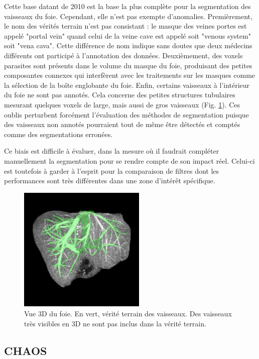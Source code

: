 Cette base datant de 2010 est la base la plus complète pour la segmentation des vaisseaux du foie. Cependant, elle n'est pas exempte d'anomalies. Premièrement, le nom des vérités terrain n'est pas consistant : le masque des veines portes est appelé "portal vein" quand celui de la veine cave est appelé soit "venous system" soit "vena cava". Cette différence de nom indique sans doutes que deux médecins différents ont participé à l'annotation des données. Deuxièmement, des voxels parasites sont présents dans le volume du masque du foie, produisant des petites composantes connexes qui interfèrent avec les traitements sur les masques comme la sélection de la boîte englobante du foie. Enfin, certains vaisseaux à l'intérieur du foie ne sont pas annotés. Cela concerne des petites structures tubulaires mesurant quelques voxels de large, mais aussi de gros vaisseaux (Fig. \ref{fig:missing_annotations}). Ces oublis perturbent forcément l'évaluation des méthodes de segmentation puisque des vaisseaux non annotés pourraient tout de même être détectés et comptés comme des segmentations erronées. 

Ce biais est difficile à évaluer, dans la mesure où il faudrait compléter manuellement la segmentation pour se rendre compte de son impact réel. Celui-ci est toutefois à garder à l'esprit pour la comparaison de filtres dont les performances sont très différentes dans une zone d'intérêt spécifique.

\begin{figure}
    \centering
    \includegraphics[height=6cm]{Images/missing_annotations.png}
    \caption{Vue 3D du foie. En vert, vérité terrain des vaisseaux. Des vaisseaux très visibles en 3D ne sont pas inclus dans la vérité terrain.}
    \label{fig:missing_annotations}
\end{figure}

\subsection{CHAOS}

